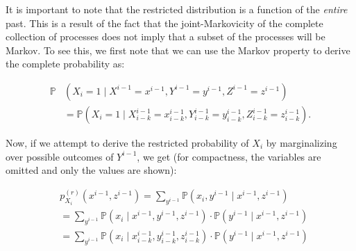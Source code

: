It is important to note that the restricted distribution is a function of the \emph{entire} past. This is a result of the fact that the joint-Markovicity of the complete collection of processes does not imply that a subset of the processes will be Markov. To see this, we first note that we can use the Markov property to derive the complete probability as:

\begin{equation*}
\begin{aligned}
\mathbb{P}&(X_i = 1 \mid X^{i-1} = x^{i-1},Y^{i-1} = y^{i-1},Z^{i-1} = z^{i-1}) \\
&= \mathbb{P}(X_i = 1 \mid X_{i-k}^{i-1} = x_{i-k}^{i-1},Y_{i-k}^{i-1} = y_{i-k}^{i-1},Z_{i-k}^{i-1} = z_{i-k}^{i-1}).
\end{aligned}
\end{equation*}

\noindent Now, if we attempt to derive the restricted probability of $X_i$ by marginalizing over possible outcomes of $Y^{i-1}$, we get (for compactness, the variables are omitted and only the values are shown):

\begin{equation*}
\begin{aligned}
&p_{X_i}^{(r)}(x^{i-1},z^{i-1}) = \sum_{y^{i-1}} \mathbb{P}(x_i,y^{i-1} \mid x^{i-1},z^{i-1}) \\
&= \sum_{y^{i-1}}
\mathbb{P}(x_i \mid x^{i-1},y^{i-1} ,z^{i-1})
\cdot \mathbb{P}(y^{i-1}\mid x^{i-1},z^{i-1}) \\
&= \sum_{y^{i-1}}
\mathbb{P}(x_i \mid x_{i-k}^{i-1},y_{i-k}^{i-1} ,z_{i-k}^{i-1})
\cdot \mathbb{P}(y^{i-1}\mid x^{i-1},z^{i-1}) \\
\end{aligned}
\end{equation*}

